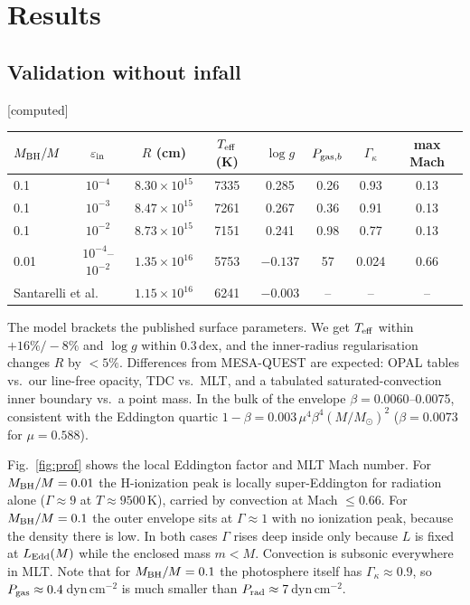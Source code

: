 \documentclass[11pt]{article}
\newcommand{\Msun}{M_\odot}
\newcommand{\status}[1]{\textsf{\small\textcolor{black!60}{[#1]}}}
\begin{document}
\section{Results}
\subsection{Validation without infall}\status{computed}
\begin{center}
\begin{tabular}{lccccccc}
\toprule
$M_{\rm BH}/M$ & $\varepsilon_{\rm in}$ & $R$ (cm) & $T_{\rm eff}$ (K) & $\log g$ & $P_{{\rm gas},b}$ & $\Gamma_\kappa$ & max Mach \\
\midrule
0.1 & $10^{-4}$ & $8.30\times10^{15}$ & 7335 & 0.285 & 0.26 & 0.93 & 0.13\\
0.1 & $10^{-3}$ & $8.47\times10^{15}$ & 7261 & 0.267 & 0.36 & 0.91 & 0.13\\
0.1 & $10^{-2}$ & $8.73\times10^{15}$ & 7151 & 0.241 & 0.98 & 0.77 & 0.13\\
0.01 & $10^{-4}$--$10^{-2}$ & $1.35\times10^{16}$ & 5753 & $-0.137$ & 57 & 0.024 & 0.66\\
\midrule
\multicolumn{2}{l}{Santarelli et al.} & $1.15\times10^{16}$ & 6241 & $-0.003$ & -- & -- & -- \\
\bottomrule
\end{tabular}
\end{center}
The model brackets the published surface parameters. We get $T_{\rm eff}$ within $+16\%/-8\%$ and $\log g$
within 0.3\,dex, and the inner-radius regularisation changes $R$ by $<5\%$. Differences from MESA-QUEST are expected:
OPAL tables vs.\ our line-free opacity, TDC vs.\ MLT, and a tabulated saturated-convection inner boundary vs.\ a point
mass. In the bulk of the envelope $\beta=0.0060$--0.0075, consistent with the Eddington quartic
$1-\beta=0.003\,\mu^4\beta^4(M/\Msun)^2$ ($\beta=0.0073$ for $\mu=0.588$).

Fig.~\ref{fig:prof} shows the local Eddington factor and MLT Mach number. For $M_{\rm BH}/M=0.01$ the
H-ionization peak is locally super-Eddington for radiation alone ($\Gamma\approx9$ at $T\approx9500$\,K), carried by
convection at Mach $\le0.66$. For $M_{\rm BH}/M=0.1$ the outer envelope sits at $\Gamma\approx1$ with no
ionization peak, because the density there is low. In both cases $\Gamma$ rises deep inside only because $L$ is fixed at
$L_{\rm Edd}(M)$ while the enclosed mass $m<M$. Convection is subsonic everywhere in MLT. Note that for
$M_{\rm BH}/M=0.1$ the photosphere itself has $\Gamma_\kappa\approx0.9$, so $P_{\rm gas}\approx0.4$\,dyn\,cm$^{-2}$
is much smaller than $P_{\rm rad}\approx7$\,dyn\,cm$^{-2}$.
\end{document}
